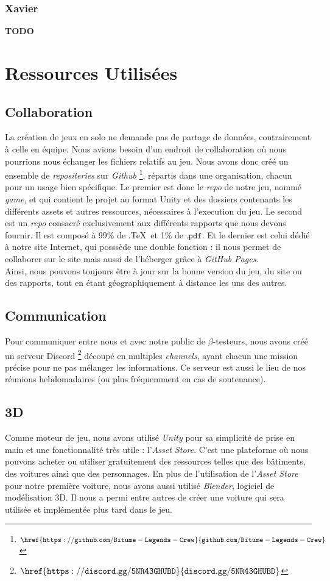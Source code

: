 \documentclass[12pt,a4paper]{article}
\begin{document}
\subsubsection{Xavier}
\textbf{TODO}



\clearpage
\section{Ressources Utilisées}
\subsection{Collaboration}
La création de jeux en solo ne demande pas de partage de données, contrairement 
à celle en équipe. Nous avions besoin d'un endroit de collaboration où nous 
pourrions nous échanger les fichiers relatifs au jeu. 
Nous avons donc créé un ensemble de \textit{repositeries} sur \textit{Github}
\footnote{\(\mathtt{\href{https://github.com/Bitume-Legends-Crew}{github.com/Bitume-Legends-Crew}}\)},
répartis dans une organisation, chacun pour un usage bien spécifique.
Le premier est donc le \textit{repo} de notre jeu, nommé \textit{game}, et qui
contient le projet au format Unity et des dossiers contenants les différents 
assets et autres ressources, nécessaires à l'execution du jeu. 
Le second est un \textit{repo} consacré exclusivement aux différents rapports 
que nous devons fournir. Il est composé à 99\% de .\TeX\, et 1\% de \(\mathtt{.pdf}\).
Et le dernier est celui dédié à notre site Internet, qui posssède une double
fonction : il nous permet de collaborer sur le site mais aussi de l'héberger 
grâce à \textit{GitHub Pages}.\\
Ainsi, nous pouvons toujours être à jour sur la bonne version du jeu,
du site ou des rapports, tout en étant géographiquement à distance les uns 
des autres.

\subsection{Communication}
Pour communiquer entre nous et avec notre public de \(\beta\)-testeurs, nous
avons créé un serveur Discord \footnote{\(\mathtt{\href{https://discord.
gg/5NR43GHUBD}{discord.gg/5NR43GHUBD}}\)} découpé en multiples 
\textit{channels}, ayant chacun une mission précise pour ne pas mélanger les
informations. Ce serveur est aussi le lieu de nos réunions hebdomadaires 
(ou plus fréquemment en cas de soutenance).

\subsection{3D}
Comme moteur de jeu, nous avons utilisé \textit{Unity} pour sa simplicité de prise en main 
et une fonctionnalité très utile : l'\textit{Asset Store}. C'est une plateforme où nous pouvons 
acheter ou utiliser gratuitement des ressources telles que des bâtiments, des voitures ainsi
que des personnages. En plus de l'utilisation de l'\textit{Asset Store} pour 
notre première voiture, 
nous avons aussi utilisé \textit{Blender}, logiciel de modélisation 3D. 
Il nous a permi entre autres de créer une voiture qui sera utilisée et 
implémentée plus tard dans le jeu. 
\end{document}
